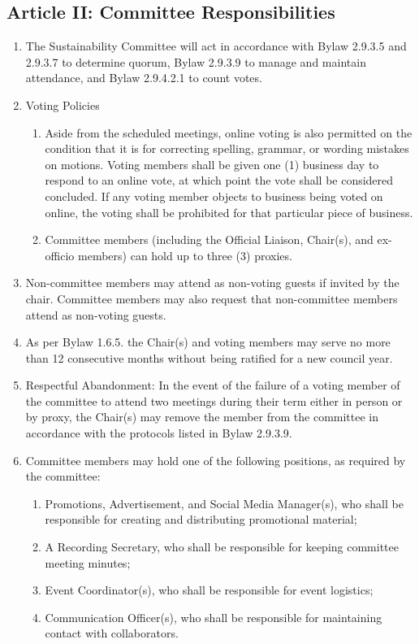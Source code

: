 \subsection{Article II: Committee Responsibilities}
\begin{enumerate}[label*=\arabic*., align=left]	
\item The Sustainability Committee will act in accordance with Bylaw 2.9.3.5 and 2.9.3.7 to determine quorum, Bylaw 2.9.3.9 to manage and maintain attendance, and Bylaw 2.9.4.2.1 to count votes.
\item Voting Policies
\begin{enumerate}[label*=\arabic*., align=left]
\item Aside from the scheduled meetings, online voting is also permitted on the condition that it is for correcting spelling, grammar, or wording mistakes on motions. Voting members shall be given one (1) business day to respond to an online vote, at which point the vote shall be considered concluded. If any voting member objects to business being voted on online, the voting shall be prohibited for that particular piece of business.
\item Committee members (including the Official Liaison, Chair(s), and ex-officio members) can hold up to three (3) proxies.
\end{enumerate}
\item Non-committee members may attend as non-voting guests if invited by the chair. Committee members may also request that non-committee members attend as non-voting guests.
\item As per Bylaw 1.6.5. the Chair(s) and voting members may serve no more than 12 consecutive months without being ratified for a new council year.
\item Respectful Abandonment: In the event of the failure of a voting member of the committee to attend two meetings during their term either in person or by proxy, the Chair(s) may remove the member from the committee in accordance with the protocols listed in Bylaw 2.9.3.9.
\item Committee members may hold one of the following positions, as required by the committee:
\begin{enumerate}[label*=\arabic*., align=left]
\item Promotions, Advertisement, and Social Media Manager(s), who shall be responsible for creating and distributing promotional material;
\item A Recording Secretary, who shall be responsible for keeping committee meeting minutes;
\item Event Coordinator(s), who shall be responsible for event logistics;
\item Communication Officer(s), who shall be responsible for maintaining contact with collaborators.
\end{enumerate}
\end{enumerate}

